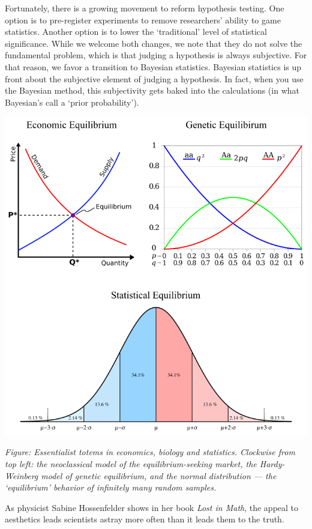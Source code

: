\documentclass[
]{book}
\begin{document}
Fortunately, there is a growing movement to reform hypothesis testing. One option is to pre-register experiments to remove researchers' ability to game statistics. Another option is to lower the `traditional' level of statistical significance.
While we welcome both changes, we note that they do not solve the fundamental problem, which is that judging a hypothesis is always subjective.
For that reason, we favor a transition to Bayesian statistics.
Bayesian statistics is up front about the subjective element of judging a hypothesis. In fact, when you use the Bayesian method, this subjectivity gets baked into the calculations (in what Bayesian's call a `prior probability').

\includegraphics{fig/essentialist_totems.png}

\emph{Figure: Essentialist totems in economics, biology and statistics. Clockwise from top left: the neoclassical model of the equilibrium-seeking market, the Hardy-Weinberg model of genetic equilibrium, and the normal distribution --- the `equilibrium' behavior of infinitely many random samples.}

As physicist Sabine Hossenfelder shows in her book \emph{Lost in Math}, the appeal to aesthetics leads scientists astray more often than it leads them to the truth.
\end{document}
